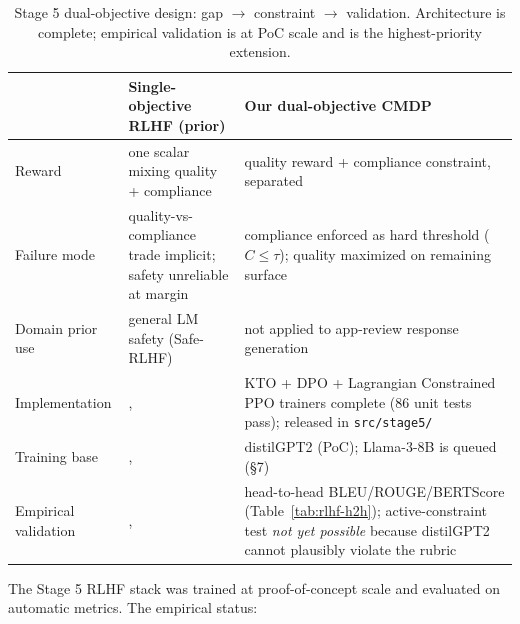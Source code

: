\documentclass[sigconf, nonacm, anonymous, balance=false]{acmart}
\begin{document}
\begin{table}[t]\centering\footnotesize\setlength{\tabcolsep}{2pt}
\caption{Stage 5 dual-objective design: gap $\to$ constraint $\to$ validation. Architecture is complete; empirical validation is at PoC scale and is the highest-priority extension.}\label{tab:rlhf-design}
\begin{tabular}{p{1.6cm}p{2.8cm}p{2.6cm}}\toprule
& Single-objective RLHF (prior) & \textbf{Our dual-objective CMDP} \\\midrule
Reward & one scalar mixing quality + compliance & quality reward + compliance constraint, separated \\
Failure mode & quality-vs-compliance trade implicit; safety unreliable at margin & compliance enforced as hard threshold ($C\le\tau$); quality maximized on remaining surface \\
Domain prior use & general LM safety (Safe-RLHF) & not applied to app-review response generation \\
\addlinespace
Implementation &, & KTO + DPO + Lagrangian Constrained PPO trainers complete (86 unit tests pass); released in \texttt{src/stage5/} \\
Training base &, & distilGPT2 (PoC); Llama-3-8B is queued (\S7) \\
Empirical validation &, & head-to-head BLEU/ROUGE/BERTScore (Table~\ref{tab:rlhf-h2h}); active-constraint test \emph{not yet possible} because distilGPT2 cannot plausibly violate the rubric \\\bottomrule
\end{tabular}\end{table}

The Stage 5 RLHF stack was trained at proof-of-concept scale and evaluated on automatic metrics. The empirical status:
\end{document}
